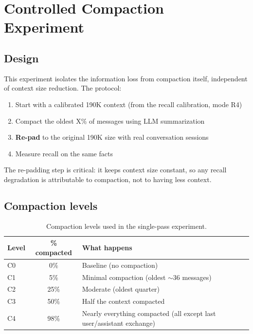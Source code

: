 \section{Controlled Compaction Experiment}
\label{sec:controlled}

\subsection{Design}
\label{sec:controlled-design}

This experiment isolates the information loss from compaction itself,
independent of context size reduction. The protocol:

\begin{enumerate}
  \item Start with a calibrated 190K context (from the recall calibration, mode R4)
  \item Compact the oldest X\% of messages using LLM summarization
  \item \textbf{Re-pad} to the original 190K size with real conversation sessions
  \item Measure recall on the same facts
\end{enumerate}

The re-padding step is critical: it keeps context size constant, so any recall
degradation is attributable to compaction, not to having less context.

\subsection{Compaction levels}
\label{sec:compaction-levels}

\begin{table}[h]
\centering
\caption{Compaction levels used in the single-pass experiment.}
\label{tab:compaction-levels}
\begin{tabular}{lcl}
\toprule
Level & \% compacted & What happens \\
\midrule
C0 & 0\%   & Baseline (no compaction) \\
C1 & 5\%   & Minimal compaction (oldest $\sim$36 messages) \\
C2 & 25\%  & Moderate (oldest quarter) \\
C3 & 50\%  & Half the context compacted \\
C4 & 98\%  & Nearly everything compacted (all except last user/assistant exchange) \\
\bottomrule
\end{tabular}
\end{table}

